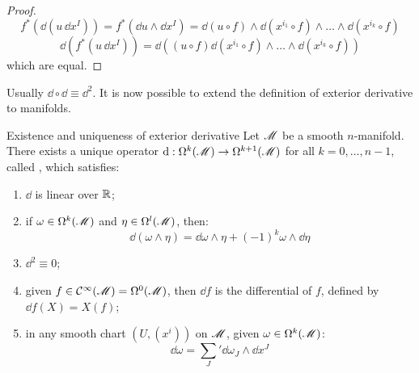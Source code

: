 \begin{proofbox}
\begin{proof}
    \begin{equation*}
      f^*(\dd (u \, \dd x^I)) = f^*(\dd u \wedge \dd x^I) = \dd (u \circ f) \wedge \dd (x^{i_1} \circ f) \wedge \dots \wedge \dd (x^{i_k} \circ f)
    \end{equation*}
    \begin{equation*}
      \dd (f^*(u \, \dd x^I)) = \dd ((u \circ f) \dd (x^{i_1} \circ f) \wedge \dots \wedge \dd (x^{i_k} \circ f))
    \end{equation*}
    which are equal.
  \end{proof}
\end{proofbox}

Usually $ \dd \circ \dd \equiv \dd^2 $.
It is now possible to extend the definition of exterior derivative to manifolds.

\begin{theorem}{Existence and uniqueness of exterior derivative}{}
  Let $ \mathscr{M} $ be a smooth $ n $-manifold. There exists a unique operator $ \mathrm{d} : \Omega^{k}(\mathscr{M}) \rightarrow \Omega^{k+1}(\mathscr{M}) $ for all $ k = 0, \dots, n-1 $, called , which satisfies:
  \begin{enumerate}
    \item \label{item:eued-1} $ \dd $ is linear over $ \mathbb{R} $;
    \item \label{item:eued-2} if $ \omega \in \Omega^{k}(\mathscr{M}) $ and $ \eta \in \Omega^{l}(\mathscr{M}) $, then:
      \begin{equation}
        \dd (\omega \wedge \eta) = \dd \omega \wedge \eta + (-1)^k \omega \wedge \dd \eta
      \end{equation}
    \item \label{item:eued-3} $ \dd^2 \equiv 0 $;
    \item \label{item:eued-4} given $ f \in \mathcal{C}^{\infty}(\mathscr{M}) = \Omega^{0}(\mathscr{M}) $, then $ \dd f $ is the differential of $ f $, defined by $ \dd f(X) = X(f) $;
    \item \label{item:eued-5} in any smooth chart $ (U,(x^i)) $ on $ \mathscr{M} $, given $ \omega \in \Omega^{k}(\mathscr{M}) $:
      \begin{equation}
        \dd \omega = {\sum_J}' \dd \omega_J \wedge \dd x^J
        \label{eq:exterior-derivative-def}
      \end{equation}
  \end{enumerate}
\end{theorem}


